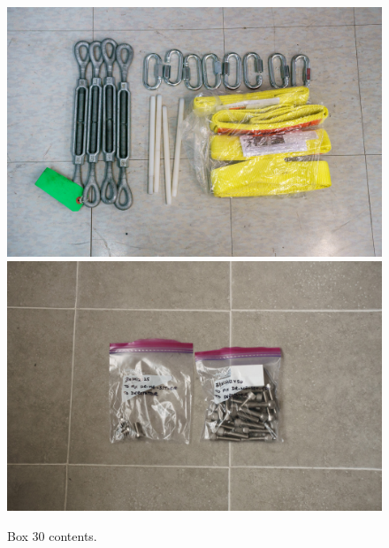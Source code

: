 \documentclass{article}
\begin{document}
\begin{figure}[bp]
\begin{center}
\includegraphics[width=0.80\linewidth]{figures/20201209T111843.jpg}\\[\smallskipamount]
\includegraphics[width=0.80\linewidth]{figures/20201210T105443.jpg}
\end{center}
\caption{Box 30 contents.}
\label{figure:box-thirty-contents}
\end{figure}
\end{document}
